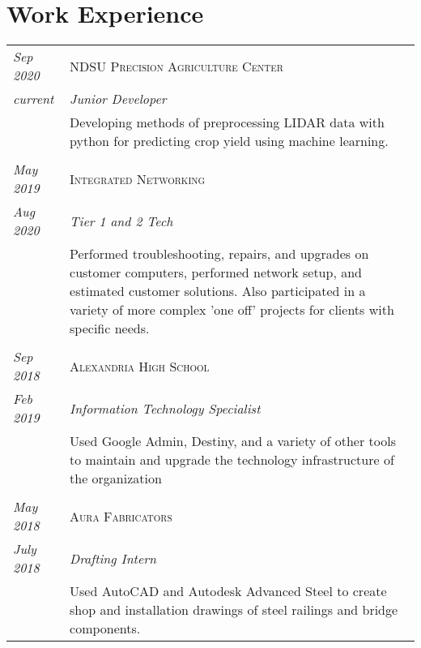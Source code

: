 \documentclass[letterpaper,10pt]{article}
\begin{document}
\section*{Work Experience}
	\begin{tabular}{R{2cm}|p{14cm}}
	\textsl{Sep 2020}	& \textsc{NDSU Precision Agriculture Center}\\
	\textsl{current}	& \emph{Junior Developer}\\
	& Developing methods of preprocessing LIDAR data with python for predicting crop yield using machine learning.\\
	\\
	\textsl{May 2019}	& \textsc{Integrated Networking}\\
	\textsl{Aug 2020}	& \emph{Tier 1 and 2 Tech}\\
	& Performed troubleshooting, repairs, and upgrades on customer computers, performed network setup, and estimated customer solutions.
	Also participated in a variety of more complex 'one off' projects for clients with specific needs.\\
	\\
	\textsl{Sep 2018}	& \textsc{Alexandria High School}\\
	\textsl{Feb 2019}	& \emph{Information Technology Specialist}\\
	& Used Google Admin, Destiny, and a variety of other tools to maintain and upgrade the technology infrastructure of the organization\\
	\\
	\textsl{May 2018}   & \textsc{Aura Fabricators}\\
	\textsl{July 2018}  & \emph{Drafting Intern}\\
	&Used AutoCAD and Autodesk Advanced Steel to create shop and installation drawings of steel railings and bridge components.\\
	\end{tabular}
\newpage
\end{document}
